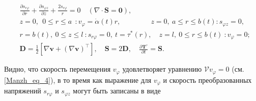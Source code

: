 \begin{align}\label{Manzh_eq_10}%

  &

  \frac{\partial s_{r\varphi}}{\partial r}+\frac{\partial s_{\varphi z}}{\partial z}+\frac{2s_{r\varphi}}r=0\quad

  (\nabla\cdot\mathbf S=\mathbf 0),

\\[2mm]

  &\nonumber

  z=0,\  \ 0\leq r\leq a  \ \ \colon v_\varphi=\dot\alpha(t)r,

\quad \quad \ \quad \quad 

  z=0,\ a\leq r\leq b(t)\colon s_{\varphi z}=0,

\\

  &\nonumber

  r=b(t),\ 0\leq z\leq l \! \ \colon s_{r\varphi}=0,\   t=\tau^*(r),

\quad 

  z=l,\ 0\leq r\leq b(t) \ \! \colon v_\varphi=0;

\\[2mm]

  &\nonumber

  \mathbf D=\frac12[\nabla\mathbf v+(\nabla\mathbf v)^\top],

\quad 

  \mathbf S=2\mathbf D,\quad   \frac{\partial\mathbf T^\circ}{\partial t}=\mathbf S.

\end{align}



Видно, что скорость перемещения $v_\varphi$ удовлетворяет уравнению ${\boldsymbol{\mathcal V}v_\varphi=0}$ (см. \eqref{Manzh_eq_4}), в то время как выражение для $v_\varphi$ и скорость преобразованных нап\-ряжений $s_{r\varphi}$ и $s_{\varphi z}$ могут быть записаны в виде

